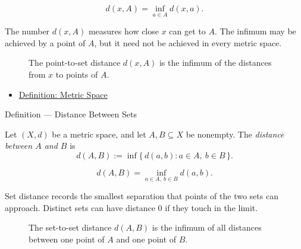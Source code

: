 \begin{remark*}
\[
d(x,A)=\inf_{a\in A}d(x,a).
\]
\end{remark*}

\begin{remark*}[Interpretation]
The number \(d(x,A)\) measures how close \(x\) can get to \(A\).  The
infimum may be achieved by a point of \(A\), but it need not be achieved in
every metric space.
\end{remark*}

\begin{figure}[htbp]
\centering

\caption{The point-to-set distance \(d(x,A)\) is the infimum of the distances
from \(x\) to points of \(A\).}
\label{fig:metric-point-set-distance}
\end{figure}

\begin{dependencies}
\begin{itemize}
  \item \hyperref[def:metric-space]{Definition: Metric Space}
\end{itemize}
\end{dependencies}

\begin{definitionbox}{Definition --- Distance Between Sets}
\begin{definition}\label{def:metric-set-distance}
Let \((X,d)\) be a metric space, and let \(A,B\subseteq X\) be nonempty.  The
\emph{distance between \(A\) and \(B\)} is
\[
  d(A,B):=\inf\{\,d(a,b):a\in A,\ b\in B\,\}.
\]
\end{definition}
\end{definitionbox}

\begin{remark*}
\[
d(A,B)=\inf_{a\in A,\ b\in B}d(a,b).
\]
\end{remark*}

\begin{remark*}[Interpretation]
Set distance records the smallest separation that points of the two sets can
approach.  Distinct sets can have distance \(0\) if they touch in the limit.
\end{remark*}

\begin{figure}[htbp]
\centering

\caption{The set-to-set distance \(d(A,B)\) is the infimum of all distances
between one point of \(A\) and one point of \(B\).}
\label{fig:metric-set-set-distance}
\end{figure}


